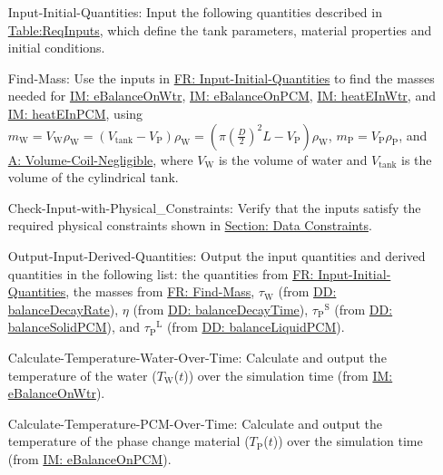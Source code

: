 \documentclass[12pt]{article}
\begin{document}
\begin{itemize}
\item[Input-Initial-Quantities:\phantomsection\label{inputInitQuants}]{Input the following quantities described in \hyperref[Table:ReqInputs]{Table:ReqInputs}, which define the tank parameters, material properties and initial conditions.}
\item[Find-Mass:\phantomsection\label{findMass}]{Use the inputs in \hyperref[inputInitQuants]{FR: Input-Initial-Quantities} to find the masses needed for \hyperref[IM:eBalanceOnWtr]{IM: eBalanceOnWtr}, \hyperref[IM:eBalanceOnPCM]{IM: eBalanceOnPCM}, \hyperref[IM:heatEInWtr]{IM: heatEInWtr}, and \hyperref[IM:heatEInPCM]{IM: heatEInPCM}, using ${m_{\text{W}}}={V_{\text{W}}} {ρ_{\text{W}}}=\left({V_{\text{tank}}}-{V_{\text{P}}}\right) {ρ_{\text{W}}}=\left(π \left(\frac{D}{2}\right)^{2} L-{V_{\text{P}}}\right) {ρ_{\text{W}}}$, ${m_{\text{P}}}={V_{\text{P}}} {ρ_{\text{P}}}$, and \hyperref[assumpVCN]{A: Volume-Coil-Negligible}, where ${V_{\text{W}}}$ is the volume of water and ${V_{\text{tank}}}$ is the volume of the cylindrical tank.}
\item[Check-Input-with-Physical\_Constraints:\phantomsection\label{checkWithPhysConsts}]{Verify that the inputs satisfy the required physical constraints shown in \hyperref[Sec:DataConstraints]{Section: Data Constraints}.}
\item[Output-Input-Derived-Quantities:\phantomsection\label{outputInputDerivQuants}]{Output the input quantities and derived quantities in the following list: the quantities from \hyperref[inputInitQuants]{FR: Input-Initial-Quantities}, the masses from \hyperref[findMass]{FR: Find-Mass}, ${τ_{\text{W}}}$ (from \hyperref[DD:balanceDecayRate]{DD: balanceDecayRate}), $η$ (from \hyperref[DD:balanceDecayTime]{DD: balanceDecayTime}), ${{τ_{\text{P}}}^{\text{S}}}$ (from \hyperref[DD:balanceSolidPCM]{DD: balanceSolidPCM}), and ${{τ_{\text{P}}}^{\text{L}}}$ (from \hyperref[DD:balanceLiquidPCM]{DD: balanceLiquidPCM}).}
\item[Calculate-Temperature-Water-Over-Time:\phantomsection\label{calcTempWtrOverTime}]{Calculate and output the temperature of the water (${T_{\text{W}}}$($t$)) over the simulation time (from \hyperref[IM:eBalanceOnWtr]{IM: eBalanceOnWtr}).}
\item[Calculate-Temperature-PCM-Over-Time:\phantomsection\label{calcTempPCMOverTime}]{Calculate and output the temperature of the phase change material (${T_{\text{P}}}$($t$)) over the simulation time (from \hyperref[IM:eBalanceOnPCM]{IM: eBalanceOnPCM}).}

\end{itemize}
\end{document}
